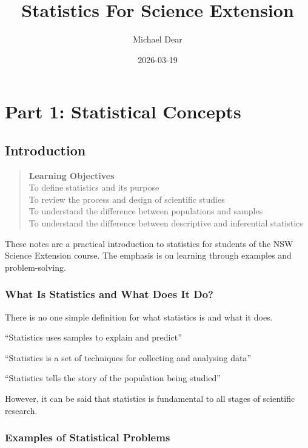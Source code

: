 \documentclass[
]{book}
\title{Statistics For Science Extension}
\author{Michael Dear}
\date{2026-03-19}
\begin{document}
\maketitle

{
\setcounter{tocdepth}{1}
\tableofcontents
}
\part*{Part 1: Statistical Concepts}\label{part-part-1-statistical-concepts}

\chapter{Introduction}\label{introduction}

\begin{quote}
\textbf{Learning Objectives}\\
To define statistics and its purpose\\
To review the process and design of scientific studies\\
To understand the difference between populations and samples\\
To understand the difference between descriptive and inferential statistics
\end{quote}

These notes are a practical introduction to statistics for students of the NSW Science Extension course. The emphasis is on learning through examples and problem-solving.

\section{What Is Statistics and What Does It Do?}\label{what-is-statistics-and-what-does-it-do}

There is no one simple definition for what statistics is and what it does.

``Statistics uses samples to explain and predict''

``Statistics is a set of techniques for collecting and analysing data''

``Statistics tells the story of the population being studied''

However, it can be said that statistics is fundamental to all stages of scientific research.

\section{Examples of Statistical Problems}\label{examples-of-statistical-problems}
\end{document}
